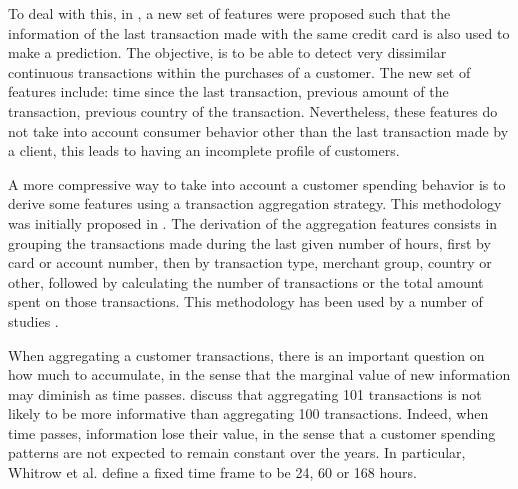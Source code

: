   To deal with this, in \citep{Gadi2008}, a new set of features were proposed such that the 
  information of the last transaction made with the same credit card is also used to make a 
  prediction. The objective, is to be able to detect very dissimilar continuous transactions within 
  the purchases of a customer. The new set of features include: time since the last transaction, 
  previous  amount of the transaction, previous country of the transaction. Nevertheless, these 
  features do not take into account consumer behavior other than the last transaction made by a 
  client, this leads to having an incomplete profile of customers.
	
	A more compressive way to take into account a customer spending behavior is to derive some 
	features using a transaction aggregation strategy. This methodology was initially proposed in 
	\citep{Whitrow2008}.  The derivation of the aggregation features consists in  grouping 
	the transactions made during the last given number of hours, first by card or account number, 
	then by transaction type, merchant group, country or other, followed by calculating the number 
	of transactions or the total amount spent on those 	transactions. This methodology has been used 
	by a number of studies 
	\citep{Bhattacharyya2011,Weston2008,Tasoulis2008,CorreaBahnsen2013,Sahin2013,CorreaBahnsen2014,
DalPozzolo2014}.
	
  When aggregating a customer transactions, there is an important question on how much to 
  accumulate, in the sense that the marginal value of new information may diminish as time passes.
  \cite{Whitrow2008} discuss that aggregating 101 transactions is not likely to be
  more informative than aggregating 100 transactions. Indeed, when time passes, information lose 
  their value, in the sense that a customer spending patterns are not expected to remain constant 
  over the years. In particular, Whitrow et al. define a fixed time frame to be 24, 60 or 168 
  hours.
  
